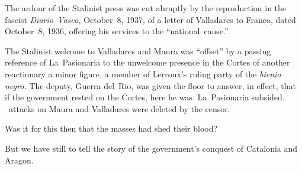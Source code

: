 The ardour of the Stalinist press was cut abruptly by the reproduction in the fascist \emph{Diario~Vasco,} October~8, 1937, of a letter of Va\-lla\-da\-res to Franco, dated October~8, 1936, offering his services to the ``national~cause.''

The Stalinist welcome to Valladares and Maura was ``offset'' by a passing reference of La~Pasionaria to the unwelcome presence in the Cortes of another reactionary a minor figure, a member of Lerroux’s ruling party of the \emph{bienio negro.} The deputy, Guerra del~Rio, was given the floor to answer, in effect, that if the government rested on the Cortes, here he was. La~Pasionaria subsided. \CNT\ attacks on Maura and Valladares were deleted by the censor.

\medskip

Was it for this then that the masses had shed their blood?

\smallskip

But we have still to tell the story of the government’s conquest of Catalonia and Aragon.